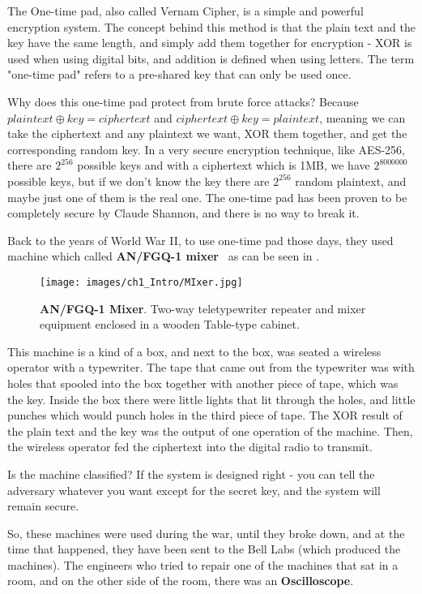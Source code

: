 The One-time pad, also called Vernam Cipher, is a simple and powerful encryption
system. The concept behind this method is that the plain text and the key have the same length, 
and simply add them together for encryption - XOR is used when using digital bits, and addition is defined when using letters.
The term "one-time pad" refers to a pre-shared key that can only be used once.

Why does this one-time pad protect from brute force attacks? Because $plaintext
\oplus key = ciphertext$ and $ciphertext \oplus key = plaintext$, meaning we can
take the ciphertext and any plaintext we want, XOR them together, and get the
corresponding random key. In a very secure encryption technique, like AES-256,
there are \(2^{256}\) possible keys and with a ciphertext which is 1MB, we have
\(2^{8000000}\) possible keys, but if we don't know the key there are
\(2^{256}\) random plaintext, and maybe just one of them is the real one. The
one-time pad has been proven to be completely secure by Claude Shannon, and
there is no way to break it.

Back to the years of World War II, to use one-time pad those days, they used
machine which called \textbf{AN/FGQ-1 mixer}~\cite{cryptoMix} as can be seen in
.

\begin{figure}[!ht]
    \centering
    \texttt{[image: images/ch1\_Intro/MIxer.jpg]}
    \caption{\textbf{AN/FGQ-1 Mixer}. Two-way teletypewriter repeater and mixer equipment enclosed in a wooden Table-type cabinet.} \label{fig:Mixer}
\end{figure}

This machine is a kind of a box, and next to the box, was seated a wireless
operator with a typewriter. The tape that came out from the typewriter was
with holes that spooled into the box together with another piece of tape, which
was the key. Inside the box there were little lights that lit through the holes, and
little punches which would punch holes in the third piece of tape. The XOR result of
the plain text and the key was the output of one operation of the machine. Then, the wireless operator fed the ciphertext into the digital radio to transmit.

Is the machine classified? If the system is designed right - you can tell the
adversary whatever you want except for the secret key, and the system will
remain secure.

So, these machines were used during the war, until they broke down, and at the
time that happened, they have been sent to the Bell Labs (which produced the
machines). The engineers who tried to repair one of the machines that sat in a room,
and on the other side of the room, there was an \textbf{Oscilloscope}. 

